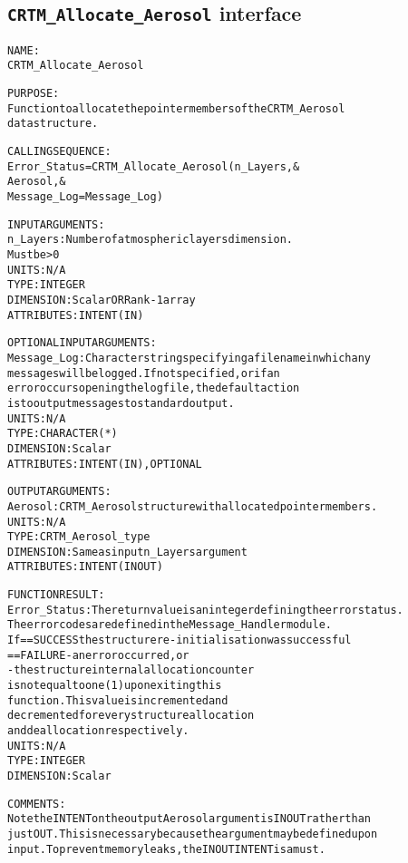 \subsection{\texttt{CRTM\_Allocate\_Aerosol} interface}
  \label{sec:CRTM_Allocate_Aerosol_interface}
  \begin{alltt}
 
  NAME:
        CRTM_Allocate_Aerosol
  
  PURPOSE:
        Function to allocate the pointer members of the CRTM_Aerosol
        data structure.
 
  CALLING SEQUENCE:
        Error_Status = CRTM_Allocate_Aerosol( n_Layers               , &
                                              Aerosol                , &
                                              Message_Log=Message_Log  )
 
  INPUT ARGUMENTS:
          n_Layers:   Number of atmospheric layers dimension.
                      Must be > 0
                      UNITS:      N/A
                      TYPE:       INTEGER
                      DIMENSION:  Scalar OR Rank-1 array
                      ATTRIBUTES: INTENT(IN)
 
  OPTIONAL INPUT ARGUMENTS:
        Message_Log:  Character string specifying a filename in which any
                      messages will be logged. If not specified, or if an
                      error occurs opening the log file, the default action
                      is to output messages to standard output.
                      UNITS:      N/A
                      TYPE:       CHARACTER(*)
                      DIMENSION:  Scalar
                      ATTRIBUTES: INTENT(IN), OPTIONAL
 
  OUTPUT ARGUMENTS:
        Aerosol:      CRTM_Aerosol structure with allocated pointer members.
                      UNITS:      N/A
                      TYPE:       CRTM_Aerosol_type
                      DIMENSION:  Same as input n_Layers argument
                      ATTRIBUTES: INTENT(IN OUT)
 
 
  FUNCTION RESULT:
        Error_Status: The return value is an integer defining the error status.
                      The error codes are defined in the Message_Handler module.
                      If == SUCCESS the structure re-initialisation was successful
                         == FAILURE - an error occurred, or
                                    - the structure internal allocation counter
                                      is not equal to one (1) upon exiting this
                                      function. This value is incremented and
                                      decremented for every structure allocation
                                      and deallocation respectively.
                      UNITS:      N/A
                      TYPE:       INTEGER
                      DIMENSION:  Scalar
 
  COMMENTS:
        Note the INTENT on the output Aerosol argument is IN OUT rather than
        just OUT. This is necessary because the argument may be defined upon
        input. To prevent memory leaks, the IN OUT INTENT is a must.
 
  \end{alltt}
